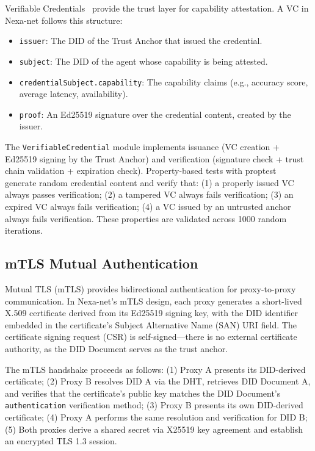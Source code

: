 Verifiable Credentials~\cite{w3c_vc_2022} provide the trust layer for capability attestation. A VC in Nexa-net follows this structure:

\begin{itemize}
  \item \texttt{issuer}: The DID of the Trust Anchor that issued the credential.
  \item \texttt{subject}: The DID of the agent whose capability is being attested.
  \item \texttt{credentialSubject.capability}: The capability claims (e.g., accuracy score, average latency, availability).
  \item \texttt{proof}: An Ed25519 signature over the credential content, created by the issuer.
\end{itemize}

The \texttt{VerifiableCredential} module implements issuance (VC creation + Ed25519 signing by the Trust Anchor) and verification (signature check + trust chain validation + expiration check). Property-based tests with proptest~\cite{proptest2019} generate random credential content and verify that: (1) a properly issued VC always passes verification; (2) a tampered VC always fails verification; (3) an expired VC always fails verification; (4) a VC issued by an untrusted anchor always fails verification. These properties are validated across 1000 random iterations.

\subsection{mTLS Mutual Authentication}

Mutual TLS (mTLS) provides bidirectional authentication for proxy-to-proxy communication. In Nexa-net's mTLS design, each proxy generates a short-lived X.509 certificate derived from its Ed25519 signing key, with the DID identifier embedded in the certificate's Subject Alternative Name (SAN) URI field. The certificate signing request (CSR) is self-signed---there is no external certificate authority, as the DID Document serves as the trust anchor.

The mTLS handshake proceeds as follows: (1) Proxy A presents its DID-derived certificate; (2) Proxy B resolves DID A via the DHT, retrieves DID Document A, and verifies that the certificate's public key matches the DID Document's \texttt{authentication} verification method; (3) Proxy B presents its own DID-derived certificate; (4) Proxy A performs the same resolution and verification for DID B; (5) Both proxies derive a shared secret via X25519 key agreement and establish an encrypted TLS 1.3 session.

